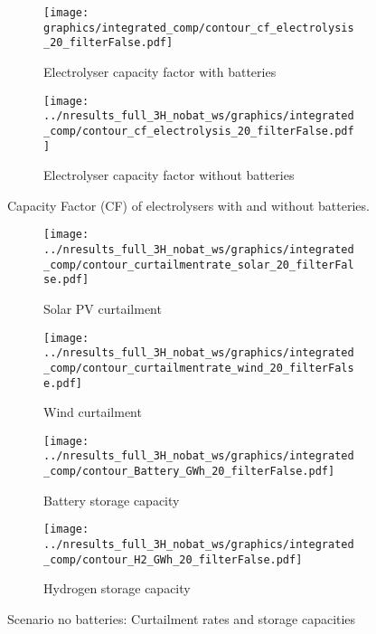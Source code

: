 \begin{figure*}[t] 
    \centering
    \begin{subfigure}[b]{0.45\linewidth}
        \centering
        \texttt{[image: graphics/integrated\_comp/contour\_cf\_electrolysis\_20\_filterFalse.pdf]}
        \caption{Electrolyser capacity factor with batteries}
        \label{fig:ely_cf}
    \end{subfigure}
    \hfill
    \begin{subfigure}[b]{0.45\linewidth}
        \centering
        \texttt{[image: ../nresults\_full\_3H\_nobat\_ws/graphics/integrated\_comp/contour\_cf\_electrolysis\_20\_filterFalse.pdf]}
        \caption{Electrolyser capacity factor without batteries}
        \label{fig:ely_cf_nobat}
    \end{subfigure}
    \hfill

    \caption{Capacity Factor (CF) of electrolysers with and without batteries.}
    \label{fig:cf_ely_sens}
\end{figure*}



\begin{figure*}[t] %
    \centering
    \begin{subfigure}[b]{0.45\linewidth}
        \centering
        \texttt{[image: ../nresults\_full\_3H\_nobat\_ws/graphics/integrated\_comp/contour\_curtailmentrate\_solar\_20\_filterFalse.pdf]}
        \caption{Solar PV curtailment}
        \label{fig:solar_curt}
    \end{subfigure}
    \hfill
    \begin{subfigure}[b]{0.45\linewidth}
        \centering
        \texttt{[image: ../nresults\_full\_3H\_nobat\_ws/graphics/integrated\_comp/contour\_curtailmentrate\_wind\_20\_filterFalse.pdf]}
        \caption{Wind curtailment}
        \label{fig:wind_curt}
    \end{subfigure}
    \hfill
    \begin{subfigure}[b]{0.45\linewidth}
        \centering
        \texttt{[image: ../nresults\_full\_3H\_nobat\_ws/graphics/integrated\_comp/contour\_Battery\_GWh\_20\_filterFalse.pdf]}
        \caption{Battery storage capacity}
        \label{fig:battery_cap}
    \end{subfigure}
    \hfill
    \begin{subfigure}[b]{0.45\linewidth}
        \centering
        \texttt{[image: ../nresults\_full\_3H\_nobat\_ws/graphics/integrated\_comp/contour\_H2\_GWh\_20\_filterFalse.pdf]}
        \caption{Hydrogen storage capacity}
        \label{fig:hystorage_cap}
    \end{subfigure}
    \hfill

    \caption{Scenario no batteries: Curtailment rates and storage capacities}
    \label{fig:integration_options_nobat}
\end{figure*}